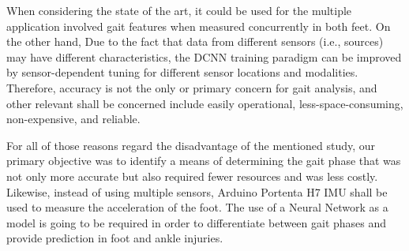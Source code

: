 \bigskip

When considering the state of the art, it could be used for the multiple application involved gait features when measured concurrently in both feet. On the other hand, Due to the fact that data from different sensors (i.e., sources) may have different characteristics, the DCNN training paradigm can be improved by sensor-dependent tuning for different sensor locations and modalities. Therefore, accuracy is not the only or primary concern for gait analysis, and other relevant shall be concerned include easily operational, less-space-consuming, non-expensive, and reliable.

\bigskip

For all of those reasons regard the disadvantage of the mentioned study, our primary objective was to identify a means of determining the gait phase that was not only more accurate but also required fewer resources and was less costly. Likewise, instead of using multiple sensors, Arduino Portenta H7 IMU shall be used to measure the acceleration of the foot. The use of a Neural Network as a model is going to be required in order to differentiate between gait phases and provide prediction in foot and ankle injuries.